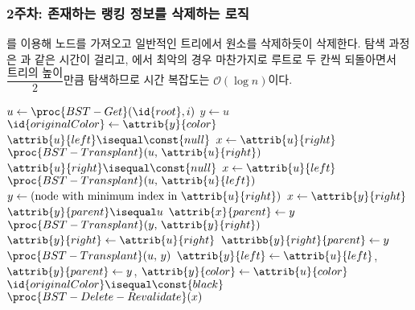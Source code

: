 \subsubsection{2주차: 존재하는 랭킹 정보를 삭제하는 로직} 를 이용해 노드를 가져오고 일반적인 트리에서 원소를 삭제하듯이 삭제한다.
 탐색 과정은 과 같은 시간이 걸리고, 에서 최악의 경우
마찬가지로 루트로 두 칸씩 되돌아면서 $\dfrac{\mbox{트리의 높이}}{2}$만큼 탐색하므로 시간 복잡도는 $\mathcal{O}\left(\log n\right)$이다.

\begin{codebox}
\li $u \gets \proc{BST-Get}(\id{root}, i)$
\li $y \gets u$
\li $\id{originalColor} \gets \attrib{y}{color}$
\li \If $\attrib{u}{left} \isequal \const{null}$ \Then
\li     $x \gets \attrib{u}{right}$
\li     $\proc{BST-Transplant}(u,\,\attrib{u}{right})$
\li \ElseIf $\attrib{u}{right} \isequal \const{null}$ \Then
\li     $x \gets \attrib{u}{left}$
\li     $\proc{BST-Transplant}(u,\,\attrib{u}{left})$
\li \ElseNoIf
\li     $y \gets \mbox{(node with minimum index in }\attrib{u}{right}\mbox{)}$
\li     $x \gets \attrib{y}{right}$
\li     \If $\attrib{y}{parent} \isequal u$ \Then
\li         $\attrib{x}{parent} \gets y$
\li     \ElseNoIf
\li         $\proc{BST-Transplant}(y,\,\attrib{y}{right})$
\li         $\attrib{y}{right} \gets \attrib{u}{right}$
\li         $\attribb{y}{right}{parent} \gets y$
        \End
\li     $\proc{BST-Transplant}(u,\,y)$
\li     $\attrib{y}{left} \gets \attrib{u}{left}$, $\attrib{y}{parent} \gets y$, $\attrib{y}{color} \gets \attrib{u}{color}$
\li     \If $\id{originalColor} \isequal \const{black}$ \Then
\li         $\proc{BST-Delete-Revalidate}(x)$
        \End
    \End
\end{codebox}

